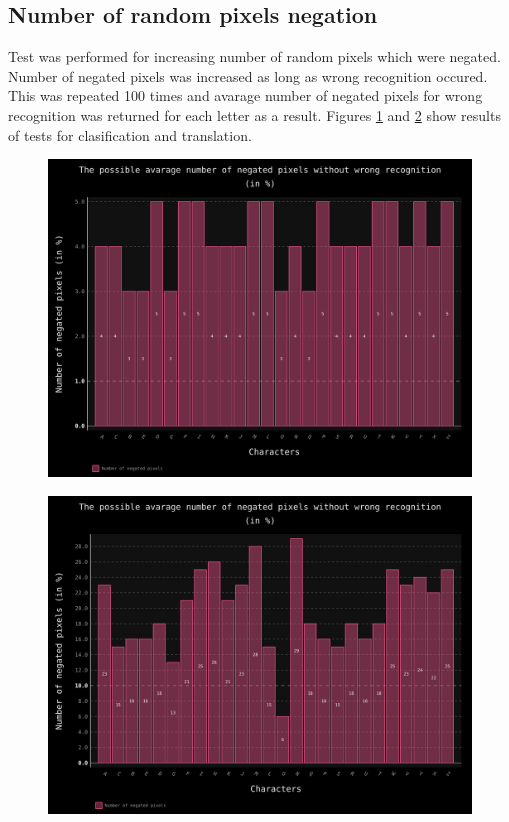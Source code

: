 \documentclass[a4paper]{article}
\begin{document}
\clearpage
\subsection{Number of random pixels negation}
Test was performed for increasing number of random pixels which were negated. Number of negated pixels was increased as long as wrong recognition occured. This was repeated 100 times and avarage number of negated pixels for wrong recognition was returned for each letter as a result. Figures \ref{noise_trans} and \ref{noise_clas} show results of tests for clasification and translation. 
\begin{figure}[ht]
	\centering
	\includegraphics[scale=0.7,keepaspectratio=true]{Charts/RandNoiseTestPlanResultsChart_NormalTester.png}	
	\caption{}
	\label{noise_trans}
\end{figure}

\begin{figure}[t]
	\centering
	\includegraphics[scale=0.7,keepaspectratio=true]{Charts/RandNoiseTestPlanResultsChart_ClasifierTester.png}	
	\caption{}
	\label{noise_clas}
\end{figure}
\end{document}
